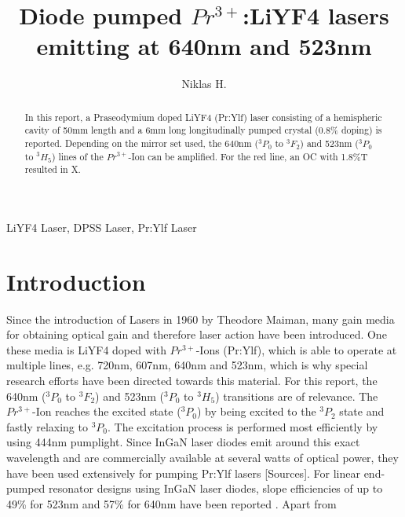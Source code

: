 \documentclass[conference]{IEEEtran}
\begin{document}
\title{Diode pumped $Pr^{3+}$:LiYF4 lasers emitting at 640nm and 523nm\\
}

\author{Niklas H.}

\maketitle

\begin{abstract}
In this report, a Praseodymium doped LiYF4 (Pr:Ylf) laser consisting of a hemispheric cavity of 50mm length and a 6mm long longitudinally pumped crystal (0.8\% doping) is reported. Depending on the mirror set used, the 640nm ($^3P_0$ to $^3F_2$) and 523nm ($^3P_0$ to $^3H_5$) lines of the $Pr^{3+}$-Ion can be amplified. For the red line, an OC with 1.8\%T resulted in X.
\end{abstract}

\begin{IEEEkeywords}
LiYF4 Laser, DPSS Laser, Pr:Ylf Laser
\end{IEEEkeywords}
\section{Introduction}

Since the introduction of Lasers in 1960 by Theodore Maiman, many gain media for obtaining optical gain and therefore laser action have been introduced. One these media is LiYF4 doped with $Pr^{3+}$-Ions (Pr:Ylf), which is able to operate at multiple lines, e.g. 720nm, 607nm, 640nm and 523nm, which is why special research efforts have been directed towards this material. For this report, the 640nm ($^3P_0$ to $^3F_2$) and 523nm ($^3P_0$ to $^3H_5$) transitions are of relevance. The $Pr^{3+}$-Ion reaches the excited state ($^3P_0$) by being excited to the $^3P_2$ state and fastly relaxing to $^3P_0$. The excitation process is performed most efficiently by using 444nm pumplight. Since InGaN laser diodes emit around this exact wavelength and are commercially available at several watts of optical power, they have been used extensively for pumping Pr:Ylf lasers [Sources]. For linear end-pumped resonator designs using InGaN laser diodes, slope efficiencies of up to 49\% for 523nm and 57\% for 640nm have been reported \cite{Luo.2016}. Apart from 
\end{document}
